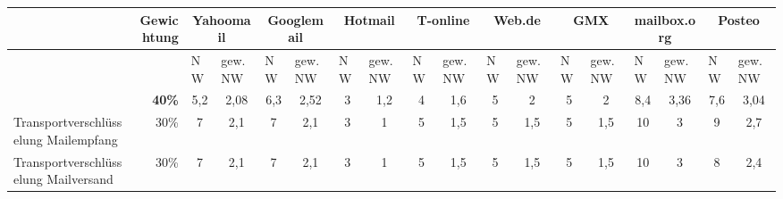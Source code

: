 \thispagestyle{empty}
\begin{landscape}
	\begin{table}
		\small
		\centering
		\renewcommand{\tabularxcolumn}[1]{>{\small}m{#1}}
		\begin{tabularx}{1.62\textwidth}{
		|>{\raggedleft\arraybackslash} p{} %
		|r %
		|X %
		|X %
		|X %
		|X %
		|X %
		|X %
		|X %
		|X %
		|X %
		|X %
		|X %
		|X %
		|X %
		|X %
		|X %
		|X %
		|} 	
		\hline 
		\multicolumn{1}{|l|}{\textbf{Kriterien}}&
		\textbf{Gewichtung}&
		\multicolumn{2}{c|}{Yahoomail}&
		\multicolumn{2}{c|}{Googlemail}&
		\multicolumn{2}{c|}{Hotmail}&
		\multicolumn{2}{c|}{T-online}&
		\multicolumn{2}{c|}{Web.de}&
		\multicolumn{2}{c|}{GMX}&
		\multicolumn{2}{c|}{mailbox.org}&
		\multicolumn{2}{c|}{Posteo}
		\\
		
		\hline 
		&
		&
		NW&
		gew. NW&
		NW&
		gew. NW&
		NW&
		gew. NW&
		NW&
		gew. NW&
		NW&
		gew. NW&
		NW&
		gew. NW&
		NW&
		gew. NW&
		NW&
		gew. NW
		\\
		
		\rowcolor{dunkelgrau}
		\hline 
		\multicolumn{1}{|l|}{\textbf{Vertraulichkeit \& Integrität}}&
		\textbf{40\%}&
		\multicolumn{1}{c|}{5,2}&
		\multicolumn{1}{c|}{2,08}&
		\multicolumn{1}{c|}{6,3}&
		\multicolumn{1}{c|}{2,52}&
		\multicolumn{1}{c|}{3}&
		\multicolumn{1}{c|}{1,2}&
		\multicolumn{1}{c|}{4}&
		\multicolumn{1}{c|}{1,6}&
		\multicolumn{1}{c|}{5}&
		\multicolumn{1}{c|}{2}&
		\multicolumn{1}{c|}{5}&
		\multicolumn{1}{c|}{2}&
		\multicolumn{1}{c}{8,4}&
		\multicolumn{1}{c|}{3,36}&
		\multicolumn{1}{c|}{7,6}&
		\multicolumn{1}{c|}{3,04}
		\\

		\hline
		Transportverschlüsselung Mailempfang&
		30\%&
		\multicolumn{1}{c|}{7}&
		\multicolumn{1}{c|}{2,1}&
		\multicolumn{1}{c|}{7}&
		\multicolumn{1}{c|}{2,1}&
		\multicolumn{1}{c|}{3}&
		\multicolumn{1}{c|}{1}&
		\multicolumn{1}{c|}{5}&
		\multicolumn{1}{c|}{1,5}&
		\multicolumn{1}{c|}{5}&
		\multicolumn{1}{c|}{1,5}&
		\multicolumn{1}{c|}{5}&
		\multicolumn{1}{c|}{1,5}&
		\multicolumn{1}{c|}{10}&
		\multicolumn{1}{c|}{3}&
		\multicolumn{1}{c|}{9}&
		\multicolumn{1}{c|}{2,7}
		\\

		\hline
		Transportverschlüsselung Mailversand&
		30\%&
		\multicolumn{1}{c|}{7}&
		\multicolumn{1}{c|}{2,1}&
		\multicolumn{1}{c|}{7}&
		\multicolumn{1}{c|}{2,1}&
		\multicolumn{1}{c|}{3}&
		\multicolumn{1}{c|}{1}&
		\multicolumn{1}{c|}{5}&
		\multicolumn{1}{c|}{1,5}&
		\multicolumn{1}{c|}{5}&
		\multicolumn{1}{c|}{1,5}&
		\multicolumn{1}{c|}{5}&
		\multicolumn{1}{c|}{1,5}&
		\multicolumn{1}{c|}{10}&
		\multicolumn{1}{c|}{3}&
		\multicolumn{1}{c|}{8}&
		\multicolumn{1}{c|}{2,4}
		\\


\end{tabularx}
\end{table}
\end{landscape}
